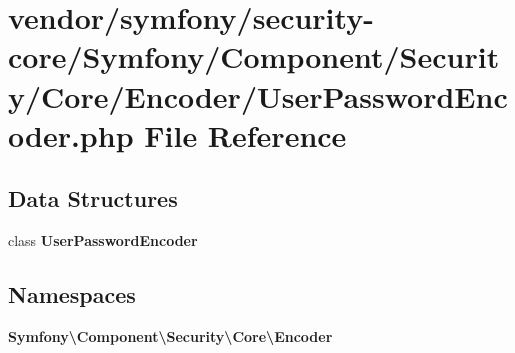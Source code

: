 \section{vendor/symfony/security-\/core/\+Symfony/\+Component/\+Security/\+Core/\+Encoder/\+User\+Password\+Encoder.php File Reference}
\label{_user_password_encoder_8php}
\subsection*{Data Structures}
\begin{DoxyCompactItemize}
\item 
class {\bf User\+Password\+Encoder}
\end{DoxyCompactItemize}
\subsection*{Namespaces}
\begin{DoxyCompactItemize}
\item 
 {\bf Symfony\textbackslash{}\+Component\textbackslash{}\+Security\textbackslash{}\+Core\textbackslash{}\+Encoder}
\end{DoxyCompactItemize}
